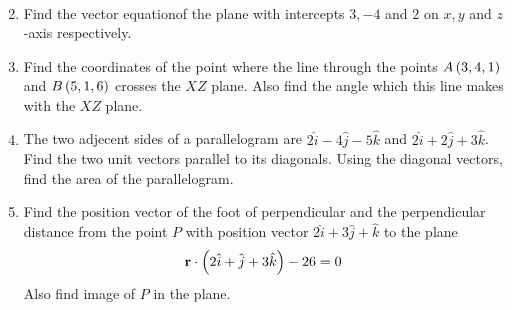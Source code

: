 \begin{enumerate}
\begin{align*}
          \end{align*}
    \item Find the vector equationof the plane with intercepts $3,-4$ and $2$ on $x,y$ and  $z$-axis respectively.
    \item Find the coordinates of the point where the line through the points $A\left(3,4,1\right)$ and $B\left(5,1,6\right)$ crosses the $XZ$ plane. Also find the angle which this line makes with the $XZ$ plane.
    \item The two adjecent sides of a parallelogram are $2\hat{i}-4\hat{j}-5\hat{k}$ and $2\hat{i}+2\hat{j}+3\hat{k}$. Find the two unit vectors parallel to its diagonals. Using the diagonal vectors, find the area of the parallelogram.
    \item Find the position vector of the foot of perpendicular and the perpendicular distance from the point $P$ with position vector $2\hat{i}+3\hat{j}+\hat{k}$ to the plane
          \begin{align*}
              \mathbf{r}\cdot\left(2\hat{i}+\hat{j}+3\hat{k}\right) - 26=0
          \end{align*}
          Also find image of $P$ in the plane.
\end{enumerate}
